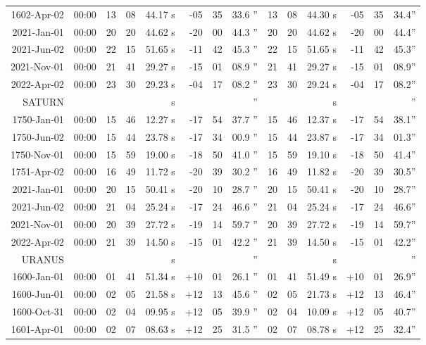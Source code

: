 \begin{longtable}{r@{\,}r|r@{h}r@{m}r<{s}|r@{°}r@{'}r<{''}||r@{h}r@{m}r<{s}|r@{°}r@{'}r<{''}}
 1602-Apr-02 & 00:00  &   13 & 08 & 44.17 & -05 & 35 & 33.6 & 13&08&44.30 & -05&35&34.4\\ %
 2021-Jan-01 & 00:00  &   20 & 20 & 44.62 & -20 & 00 & 44.3 & 20&20&44.62 & -20&00&44.4\\ %
 2021-Jun-02 & 00:00  &   22 & 15 & 51.65 & -11 & 42 & 45.3 & 22&15&51.65 & -11&42&45.3\\ %
 2021-Nov-01 & 00:00  &   21 & 41 & 29.27 & -15 & 01 & 08.9 & 21&41&29.27 & -15&01&08.9\\ %
 2022-Apr-02 & 00:00  &   23 & 30 & 29.23 & -04 & 17 & 08.2 & 23&30&29.24 & -04&17&08.2\\ %
SATURN           \\
 1750-Jan-01 & 00:00  &   15 & 46 & 12.27 & -17 & 54 & 37.7 & 15&46&12.37 & -17&54&38.1\\ %
 1750-Jun-02 & 00:00  &   15 & 44 & 23.78 & -17 & 34 & 00.9 & 15&44&23.87 & -17&34&01.3\\ %
 1750-Nov-01 & 00:00  &   15 & 59 & 19.00 & -18 & 50 & 41.0 & 15&59&19.10 & -18&50&41.4\\ %
 1751-Apr-02 & 00:00  &   16 & 49 & 11.72 & -20 & 39 & 30.2 & 16&49&11.82 & -20&39&30.5\\ %
 2021-Jan-01 & 00:00  &   20 & 15 & 50.41 & -20 & 10 & 28.7 & 20&15&50.41 & -20&10&28.7\\ %
 2021-Jun-02 & 00:00  &   21 & 04 & 25.24 & -17 & 24 & 46.6 & 21&04&25.24 & -17&24&46.6\\ %
 2021-Nov-01 & 00:00  &   20 & 39 & 27.72 & -19 & 14 & 59.7 & 20&39&27.72 & -19&14&59.7\\ %
 2022-Apr-02 & 00:00  &   21 & 39 & 14.50 & -15 & 01 & 42.2 & 21&39&14.50 & -15&01&42.2\\ %
URANUS      \\
 1600-Jan-01 & 00:00  &   01 & 41 & 51.34 & +10 & 01 & 26.1 & 01&41&51.49 & +10&01&26.9\\ %
 1600-Jun-01 & 00:00  &   02 & 05 & 21.58 & +12 & 13 & 45.6 & 02&05&21.73 & +12&13&46.4\\ %
 1600-Oct-31 & 00:00  &   02 & 04 & 09.95 & +12 & 05 & 39.9 & 02&04&10.09 & +12&05&40.7\\ %
 1601-Apr-01 & 00:00  &   02 & 07 & 08.63 & +12 & 25 & 31.5 & 02&07&08.78 & +12&25&32.4\\ %

\end{longtable}
